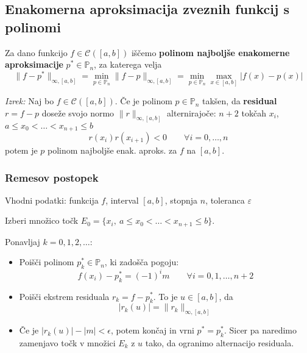 \begin{multicols}{5}
\subsection*{Enakomerna aproksimacija zveznih funkcij s polinomi}
Za dano funkcijo $f \in \mathcal{C}([a,b])$ iščemo \textbf{polinom najboljše enakomerne aproksimacije} $p^* \in \mathbb{P}_n$, za katerega velja
\[ \| f - p^* \|_{\infty, [a,b]} = \min_{p \in \mathbb{P}_n} \| f - p\|_{\infty, [a,b]} = \min_{p \in \mathbb{P}_n} \max_{x \in [a, b]} | f(x) - p(x) | \]

\textit{Izrek:} Naj bo $f \in \mathcal{C}([a, b])$. Če je polinom $p \in \mathbb{P}_n$ takšen,
da \textbf{residual} $r = f - p$ doseže svojo normo $\| r \|_{\infty, [a,b]}$ alternirajoče:
$n+2$ tokčah $x_i$, $a \leq x_0 < \dots < x_{n+1} \leq b$ 
\[ r(x_i)r(x_{i+1}) < 0 \qquad \forall i=0, \dots, n \]
potem je $p$ polinom najboljše enak. aproks. za $f$ na $[a, b]$.

\subsubsection*{Remesov postopek}
Vhodni podatki: funkcija $f$, interval $[a,b]$, stopnja $n$, toleranca $\varepsilon$

Izberi množico točk $E_0 = \{ x_i,\ a \leq x_0 < \dots < x_{n+1} \leq b \}$.

Ponavljaj $k = 0, 1, 2, \dots$:
\begin{itemize}
    \item Poišči polinom $p_k^* \in \mathbb{P}_n$, ki zadošča pogoju:
    \[ f(x_i) - p_k^* = (-1)^i m \qquad \forall i = 0, 1, \dots, n+2 \]
    \item Poišči ekstrem residuala $r_k = f - p_k^*$. To je $u \in [a,b]$, da
    \[ |r_k(u)| = \| r_k \|_{\infty, [a,b]} \]
    \item Če je $|r_k(u)| - |m| < \epsilon$, potem končaj in vrni $p^* = p_k^*$. 
    Sicer pa naredimo zamenjavo točk v množici $E_k$ z $u$ tako, da ogranimo alternacijo residuala.
\end{itemize}

\end{multicols}

